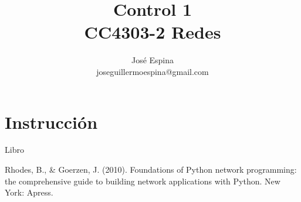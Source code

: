 \documentclass{article}
\begin{document}
\title{Control 1\\CC4303-2 Redes}
\author{José Espina\\joseguillermoespina@gmail.com}
\date{}
\maketitle
\section{Instrucción}
\cite{libro_redes_python}Libro
\begin{thebibliography}{9}
 Rhodes, B., \& Goerzen, J. (2010). Foundations of Python network programming: the comprehensive guide to building network applications with Python. New York: Apress.
\end{thebibliography}
\end{document}
